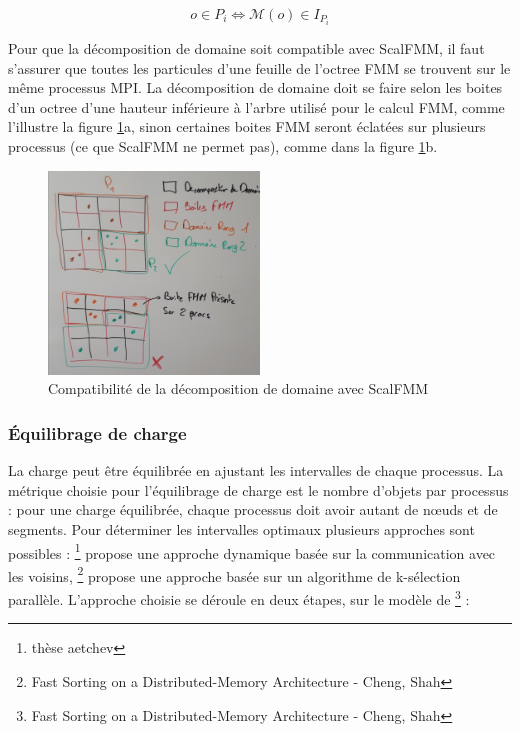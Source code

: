 \begin{equation}
    o \in P_i \Leftrightarrow \mathcal{M}(o) \in I_{P_i}
\end{equation}

Pour que la décomposition de domaine soit compatible avec ScalFMM, il faut s'assurer que toutes les particules d'une feuille de l'octree FMM se trouvent sur le même processus MPI. La décomposition de domaine doit se faire selon les boites d'un octree d'une hauteur inférieure à l'arbre utilisé pour le calcul FMM, comme l'illustre la figure \ref{fig:domaindecomposition_smaller_octree}a, sinon certaines boites FMM seront éclatées sur plusieurs processus (ce que ScalFMM ne permet pas), comme dans la figure \ref{fig:domaindecomposition_smaller_octree}b.

\begin{figure}[]
\centering
\includegraphics[width=0.5\textwidth]{img/domaindecomposition_smaller_octree}
\caption{Compatibilité de la décomposition de domaine avec ScalFMM}
\label{fig:domaindecomposition_smaller_octree}
\end{figure}

\subsubsection{Équilibrage de charge}

La charge peut être équilibrée en ajustant les intervalles de chaque processus. La métrique choisie pour l'équilibrage de charge est le nombre d'objets par processus : pour une charge équilibrée, chaque processus doit avoir autant de nœuds et de segments. Pour déterminer les intervalles optimaux plusieurs approches sont possibles : \footnote{thèse aetchev} propose une approche dynamique basée sur la communication avec les voisins, \footnote{Fast Sorting on a Distributed-Memory Architecture - Cheng, Shah} propose une approche basée sur un algorithme de k-sélection parallèle. L'approche choisie se déroule en deux étapes, sur le modèle de \footnote{Fast Sorting on a Distributed-Memory Architecture - Cheng, Shah} :

